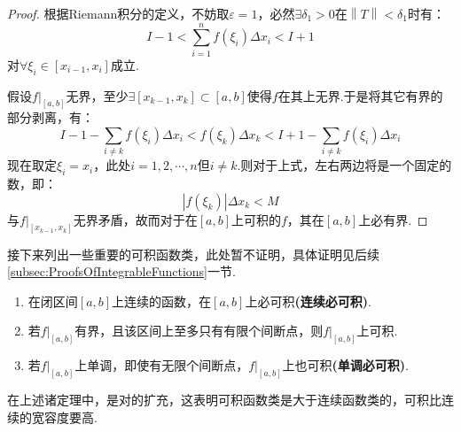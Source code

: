 \begin{proof}
    根据Riemann积分的定义，不妨取$\varepsilon = 1$，必然$\exists \delta_1>0$在$\left\|T\right\| < \delta_1$时有：
    \[I-1 < \sum_{i=1}^{n} f(\xi_i)\Delta x_i < I+1\]
    对$\forall \xi_i \in [x_{i-1},x_i]$成立.

    假设$\left.f\right|_{[a,b]}$无界，至少$\exists [x_{k-1},x_k] \subset [a,b]$使得$f$在其上无界.于是将其它有界的部分剥离，有：
    \[I - 1 - \sum_{i \neq k}f(\xi_i)\Delta x_i < f(\xi_k)\Delta x_k < I + 1 - \sum_{i \neq k}f(\xi_i)\Delta x_i\]
    现在取定$\xi_i = x_i$，此处$i = 1,2,\cdots,n$但$i \neq k$.则对于上式，左右两边将是一个固定的数，即：
    \[|f(\xi_k)|\Delta x_k < M\]
    与$\left.f\right|_{[x_{k-1},x_k]}$无界矛盾，故而对于在$[a,b]$上可积的$f$，其在$[a,b]$上必有界.
\end{proof}

接下来列出一些重要的可积函数类，此处暂不证明，具体证明见后续\cref{subsec:ProofsOfIntegrableFunctions}一节.
\begin{theorem}
    \label{thm:ClassOfIntegrableFunctions}
    \begin{enumerate}[circ]
        \item 在闭区间$[a,b]$上连续的函数，在$[a,b]$上必可积\textbf{(连续必可积)}.
        \item 若$\left.f\right|_{[a,b]}$有界，且该区间上至多只有有限个间断点，则$\left.f\right|_{[a,b]}$上可积.
        \item 若$\left.f\right|_{[a,b]}$上单调，即使有无限个间断点，$\left.f\right|_{[a,b]}$上也可积\textbf{(单调必可积)}.
    \end{enumerate}
\end{theorem}

在上述诸定理中，是对的扩充，这表明可积函数类是大于连续函数类的，可积比连续的宽容度要高.

